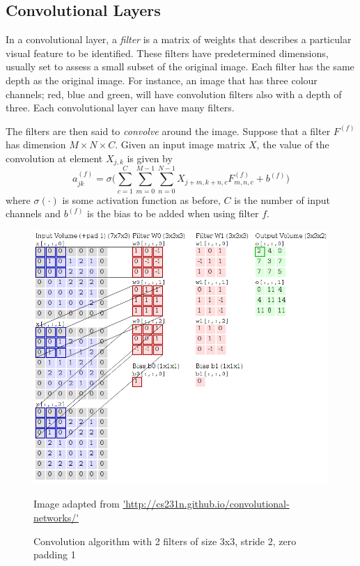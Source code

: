 \subsection{Convolutional Layers}\label{convnets-convlayer}

In a convolutional layer, a \textit{filter} is a matrix of weights that describes a particular visual feature to be identified. These filters have predetermined dimensions, usually set to assess a small subset of the original image. Each filter has the same depth as the original image. For instance, an image that has three colour channels; red, blue and green, will have convolution filters also with a depth of three. Each convolutional layer can have many filters.

The filters are then said to \textit{convolve} around the image. Suppose that a filter $F^{(f)}$ has dimension $M\times N \times C$. Given an input image matrix $X$, the value of the convolution at element $X_{j,k}$ is given by
\[
	a_{jk}^{(f)} = \sigma\bigg(\sum_{c=1}^C\sum_{m=0}^{M-1}\sum_{n=0}^{N-1}X_{j+m, k+n, c}F_{m,n,c}^{(f)}  + b^{(f)}\bigg)
\]
where $\sigma(\cdot)$ is some activation function as before, $C$ is the number of input channels and $b^{(f)}$ is the bias to be added when using filter $f$. 

\begin{figure}[ht]
	\centering
	\includegraphics[scale=0.5]{Images/3_convolution.png}
	\caption{Convolution algorithm with 2 filters of size 3x3, stride 2, zero padding 1}
	\small Image adapted from \url{'http://cs231n.github.io/convolutional-networks/'}
	\label{convnets-conv-alg}
\end{figure}

